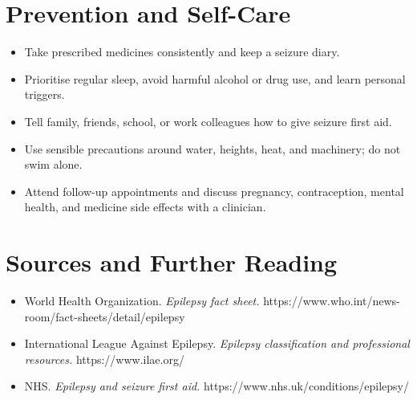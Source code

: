 \section*{Prevention and Self-Care}
\begin{itemize}
    \item Take prescribed medicines consistently and keep a seizure diary.
    \item Prioritise regular sleep, avoid harmful alcohol or drug use, and learn personal triggers.
    \item Tell family, friends, school, or work colleagues how to give seizure first aid.
    \item Use sensible precautions around water, heights, heat, and machinery; do not swim alone.
    \item Attend follow-up appointments and discuss pregnancy, contraception, mental health, and medicine side effects with a clinician.
\end{itemize}

\section*{Sources and Further Reading}
\begin{itemize}
    \item World Health Organization. \textit{Epilepsy fact sheet.} https://www.who.int/news-room/fact-sheets/detail/epilepsy
    \item International League Against Epilepsy. \textit{Epilepsy classification and professional resources.} https://www.ilae.org/
    \item NHS. \textit{Epilepsy and seizure first aid.} https://www.nhs.uk/conditions/epilepsy/
\end{itemize}
